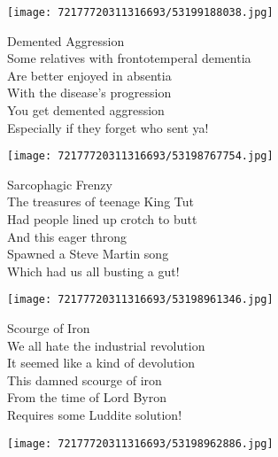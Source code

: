 \documentclass[10pt,letterpaper]{article}
\begin{document}
\begin{center}\texttt{[image: 72177720311316693/53199188038.jpg]}
\end{center}
\begin{center}
Demented Aggression\\
\vskip 0.2in
Some relatives with frontotemperal dementia\\
Are better enjoyed in absentia\\
With the disease's progression\\
You get demented aggression\\
Especially if they forget who sent ya!\\
\end{center}
\pagebreak

\begin{center}\texttt{[image: 72177720311316693/53198767754.jpg]}
\end{center}
\begin{center}
Sarcophagic Frenzy\\
\vskip 0.2in
The treasures of teenage King Tut\\
Had people lined up crotch to butt\\
And this eager throng\\
Spawned a Steve Martin song\\
Which had us all busting a gut!\\
\end{center}
\pagebreak

\begin{center}\texttt{[image: 72177720311316693/53198961346.jpg]}
\end{center}
\begin{center}
Scourge of Iron\\
\vskip 0.2in
We all hate the industrial revolution\\
It seemed like a kind of devolution\\
This damned scourge of iron\\
From the time of Lord Byron\\
Requires some Luddite solution!\\
\end{center}
\pagebreak

\begin{center}
\texttt{[image: 72177720311316693/53198962886.jpg]}
\end{center}
\end{document}
